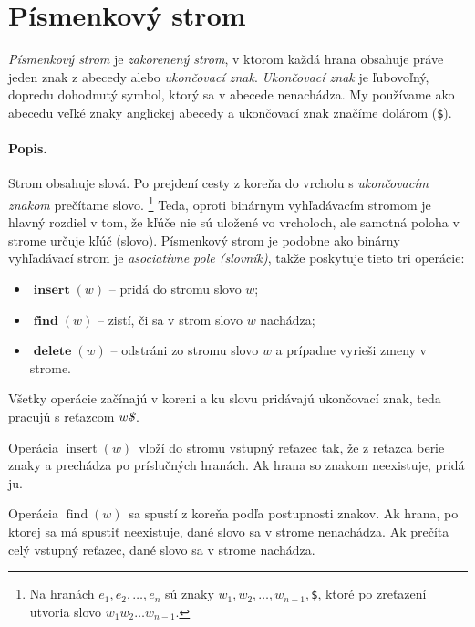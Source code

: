 
\def\k{w}
\def\put{$\mathop{insert}\left( \k\right)$}
\def\find{$\mathop{find}\left( \k\right)$}
\def\delete{$\mathop{delete}\left( \k\right)$}
\def\trie{trie}
\def\uz{{\tt\$}}

\section{Písmenkový strom}
\emph{Písmenkový strom} je \emph{zakorenený strom}, v ktorom 
každá hrana obsahuje práve jeden znak z abecedy alebo \emph{ukončovací znak}. 
\emph{Ukončovací znak} je ľubovoľný, dopredu dohodnutý symbol, ktorý sa 
v abecede nenachádza. My používame ako abecedu veľké znaky anglickej 
abecedy a ukončovací znak značíme dolárom (\uz).



\paragraph{Popis.}
Strom obsahuje slová. Po prejdení cesty 
z koreňa do vrcholu s \emph{ukončovacím znakom} prečítame slovo.%
\footnote{Na hranách $e_1, e_2, \ldots, e_n$ sú znaky $w_1, w_2, \ldots, 
w_{n-1}, $\uz, ktoré po zreťazení utvoria slovo $w_1w_2\ldots{w_{n-1}}$.} 
Teda, oproti binárnym vyhľadávacím stromom je hlavný rozdiel v tom, že kľúče 
nie sú uložené vo vrcholoch, ale samotná poloha v strome určuje kľúč (slovo). 
Písmenkový strom je podobne ako binárny vyhľadávací strom je 
\emph{asociatívne pole (slovník)}, takže poskytuje tieto tri operácie:
\begin{itemize}
\item $\mathop{\mathbf{insert}}(\k)$ -- pridá do stromu slovo $\k$;
\item $\mathop{\mathbf{find}}(\k)$ -- zistí, či sa v strom slovo $\k$ nachádza;
\item $\mathop{\mathbf{delete}}(\k)$ -- odstráni zo stromu slovo $\k$ a 
prípadne vyrieši zmeny v strome.
\end{itemize}
Všetky operácie začínajú v koreni a ku slovu pridávajú ukončovací znak, 
teda pracujú s reťazcom $\k\emph{\$}$. 

Operácia \put\ vloží do stromu vstupný reťazec tak, že z reťazca berie znaky 
a prechádza po príslučných hranách. Ak hrana so znakom neexistuje, pridá ju. 

Operácia \find\ sa spustí z koreňa podľa postupnosti znakov. Ak hrana, 
po ktorej sa má spustiť neexistuje, dané slovo sa v strome nenachádza. 
Ak prečíta celý vstupný reťazec, dané slovo sa v strome nachádza.

